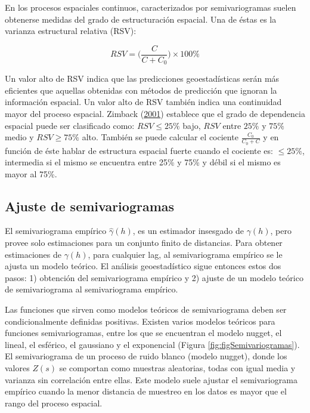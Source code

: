 \documentclass[11pt,b5paper,]{krantz}
\begin{document}
En los procesos espaciales continuos, caracterizados por semivariogramas
suelen obtenerse medidas del grado de estructuración espacial. Una de
éstas es la varianza estructural relativa (RSV):

\[RSV=\Bigg(\frac{C}{C+C_0}\Bigg)\times100\%\]

Un valor alto de RSV indica que las predicciones geoestadísticas serán
más eficientes que aquellas obtenidas con métodos de predicción que
ignoran la información espacial. Un valor alto de RSV también indica una
continuidad mayor del proceso espacial. Zimback
(\protect\hyperlink{ref-Zimback_2001}{2001}) establece que el grado de
dependencia espacial puede ser clasificado como: \(RSV \leq 25\%\) bajo,
\(RSV\) entre \(25\%\) y \(75\%\) medio y \(RSV \geq 75\%\) alto.
También se puede calcular el cociente \(\frac{C_0}{C_0+C}\) y en función
de éste hablar de estructura espacial fuerte cuando el cociente es:
\(\leq 25\%\), intermedia si el mismo se encuentra entre 25\% y 75\% y
débil si el mismo es mayor al 75\%.

\subsection{Ajuste de semivariogramas}\label{ajuste-de-semivariogramas}

El semivariograma empírico \(\hat{\gamma}(h)\), es un estimador
insesgado de \(\gamma(h)\), pero provee solo estimaciones para un
conjunto finito de distancias. Para obtener estimaciones de
\(\gamma(h)\), para cualquier lag, al semivariograma empírico se le
ajusta un modelo teórico. El análisis geoestadístico sigue entonces
estos dos pasos: 1) obtención del semivariograma empírico y 2) ajuste de
un modelo teórico de semivariograma al semivariograma empírico.

Las funciones que sirven como modelos teóricos de semivariograma deben
ser condicionalmente definidas positivas. Existen varios modelos
teóricos para funciones semivariogramas, entre los que se encuentran el
modelo nugget, el lineal, el esférico, el gaussiano y el exponencial
(Figura \ref{fig:figSemivariogramas}). El semivariograma de un proceso
de ruido blanco (modelo nugget), donde los valores \(Z\left(s\right)\)
se comportan como muestras aleatorias, todas con igual media y varianza
sin correlación entre ellas. Este modelo suele ajustar el semivariograma
empírico cuando la menor distancia de muestreo en los datos es mayor que
el rango del proceso espacial.
\end{document}
